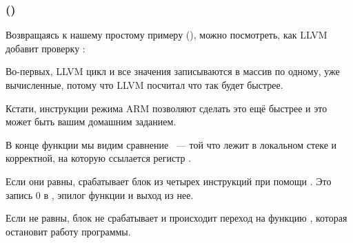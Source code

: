 \subsubsection{\OptimizingXcodeIV (\ThumbTwoMode)}

Возвращаясь к нашему простому примеру
 (),
можно посмотреть, как LLVM добавит проверку :



Во-первых, LLVM  цикл и все значения записываются в массив по одному, 
уже вычисленные, потому что LLVM посчитал что так будет быстрее.

Кстати, инструкции режима ARM позволяют сделать это ещё быстрее и это может быть вашим 
домашним заданием.

В конце функции мы видим сравнение ~--- той что лежит в локальном стеке и корректной, 
на которую ссылается регистр .

Если они равны, срабатывает блок из четырех инструкций при помощи .
Это запись 0 в , эпилог функции и выход из нее.

Если  не равны, блок не срабатывает и происходит
переход на функцию , которая остановит работу программы.

